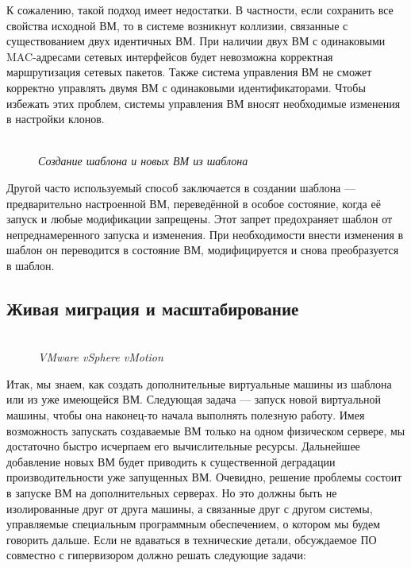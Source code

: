 \documentclass[14pt, a4paper]{article}
\begin{document}
К сожалению, такой подход имеет недостатки. В частности, если сохранить все свойства исходной
ВМ, то в системе возникнут коллизии, связанные с существованием двух идентичных ВМ. При
наличии двух ВМ с одинаковыми MAC-адресами сетевых интерфейсов будет невозможна корректная
маршрутизация сетевых пакетов. Также система управления ВМ не сможет корректно управлять
двумя ВМ с одинаковыми идентификаторами. Чтобы избежать этих проблем, системы управления ВМ
вносят необходимые изменения в настройки клонов.

\begin{figure}[h]
    \centering
    \\ 
    \small\textit{Создание шаблона и новых ВМ из шаблона}  
    \label{framework} 
\end{figure}

Другой часто используемый способ заключается в создании шаблона — предварительно настроенной
ВМ, переведённой в особое состояние, когда её запуск и любые модификации запрещены. Этот
запрет предохраняет шаблон от непреднамеренного запуска и изменения. При необходимости внести
изменения в шаблон он переводится в состояние ВМ, модифицируется и снова преобразуется в
шаблон.

\subsection*{Живая миграция и масштабирование} 

\begin{figure}[h]
    \centering
    \\ 
    \small\textit{VMware vSphere vMotion}  
    \label{framework} 
\end{figure}

Итак, мы знаем, как создать дополнительные виртуальные машины из шаблона или из уже
имеющейся ВМ. Следующая задача — запуск новой виртуальной машины, чтобы она наконец-то
начала выполнять полезную работу. Имея возможность запускать создаваемые ВМ только на одном
физическом сервере, мы достаточно быстро исчерпаем его вычислительные ресурсы. Дальнейшее
добавление новых ВМ будет приводить к существенной деградации производительности уже
запущенных ВМ. Очевидно, решение проблемы состоит в запуске ВМ на дополнительных серверах.
Но это должны быть не изолированные друг от друга машины, а связанные друг с другом системы,
управляемые специальным программным обеспечением, о котором мы будем говорить дальше. Если
не вдаваться в технические детали, обсуждаемое ПО совместно с гипервизором должно решать
следующие задачи:
\end{document}
